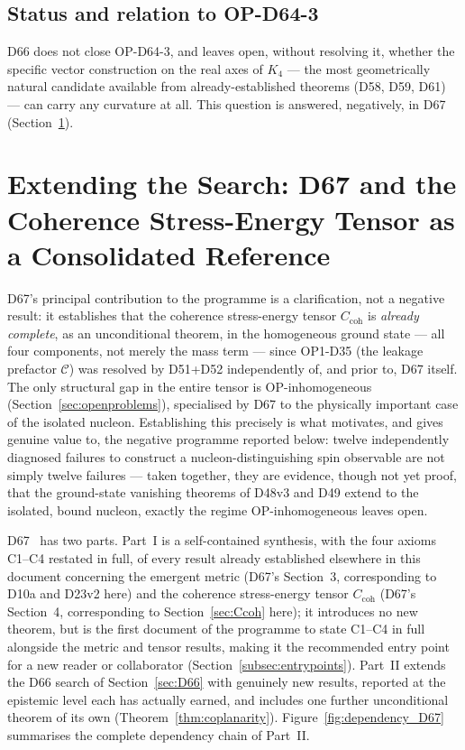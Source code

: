 \documentclass[11pt,a4paper]{article}
\theoremstyle{plain}
\theoremstyle{definition}
\theoremstyle{remark}
\newcommand{\Ccoh}{C_{\mathrm{coh}}}
\begin{document}
\subsection{Status and relation to OP-D64-3}
\label{subsec:D66status}

D66 does not close OP-D64-3, and leaves open, without resolving it, whether the specific vector construction on the real axes of $K_4$ --- the most geometrically natural candidate available from already-established theorems (D58, D59, D61) --- can carry any curvature at all. This question is answered, negatively, in D67 (Section~\ref{sec:D67}).

\section{Extending the Search: D67 and the Coherence Stress-Energy Tensor as a Consolidated Reference}
\label{sec:D67}

D67's principal contribution to the programme is a clarification, not a negative result: it establishes that the coherence stress-energy tensor $\Ccoh$ is \emph{already complete}, as an unconditional theorem, in the homogeneous ground state --- all four components, not merely the mass term --- since OP1-D35 (the leakage prefactor $\mathcal C$) was resolved by D51+D52 independently of, and prior to, D67 itself. The only structural gap in the entire tensor is OP-inhomogeneous (Section~\ref{sec:openproblems}), specialised by D67 to the physically important case of the isolated nucleon. Establishing this precisely is what motivates, and gives genuine value to, the negative programme reported below: twelve independently diagnosed failures to construct a nucleon-distinguishing spin observable are not simply twelve failures --- taken together, they are evidence, though not yet proof, that the ground-state vanishing theorems of D48v3 and D49 extend to the isolated, bound nucleon, exactly the regime OP-inhomogeneous leaves open.

D67~\cite{D67} has two parts. Part~I is a self-contained synthesis, with the four axioms C1--C4 restated in full, of every result already established elsewhere in this document concerning the emergent metric (D67's Section~3, corresponding to D10a and D23v2 here) and the coherence stress-energy tensor $\Ccoh$ (D67's Section~4, corresponding to Section~\ref{sec:Ccoh} here); it introduces no new theorem, but is the first document of the programme to state C1--C4 in full alongside the metric and tensor results, making it the recommended entry point for a new reader or collaborator (Section~\ref{subsec:entrypoints}). Part~II extends the D66 search of Section~\ref{sec:D66} with genuinely new results, reported at the epistemic level each has actually earned, and includes one further unconditional theorem of its own (Theorem~\ref{thm:coplanarity}). Figure~\ref{fig:dependency_D67} summarises the complete dependency chain of Part~II.
\end{document}
